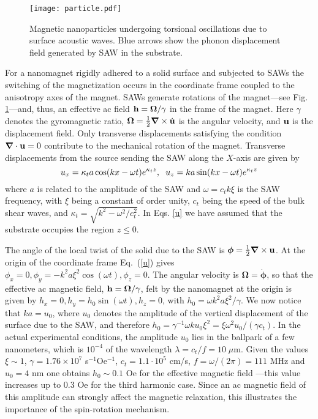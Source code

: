 \documentclass[aps,prb,floats,twocolumn]{revtex4}
\begin{document}
\begin{figure}[ht]
\begin{center}
\texttt{[image: particle.pdf]}
\caption{Magnetic nanoparticles undergoing torsional oscillations due to surface acoustic waves. Blue arrows show the phonon displacement field generated by SAW in the substrate.}
\label{particle}
\end{center}
\end{figure}
For a nanomagnet rigidly adhered to a solid surface and subjected to SAWs the switching of the magnetization occurs in the coordinate frame coupled to the anisotropy axes of the magnet. SAWs generate rotations of the magnet---see Fig. \ref{particle}---and, thus, an effective ac field ${\bf h} = {\bm \Omega}/\gamma$ in the frame of the magnet. Here $\gamma$ denotes the gyromagnetic ratio, ${\bm \Omega} = \frac{1}{2} {\bm \nabla} \times \dot{\bf u}$ is the angular velocity, and ${\bf u}$ is the displacement field.  Only transverse displacements satisfying the condition ${\bm \nabla} \cdot {\bf u} = 0$ contribute to the mechanical rotation of the magnet. Transverse displacements from the source sending the SAW along the $X$-axis are given by \cite{LL}
\begin{equation}\label{u}
u_x = \kappa_t a \cos(kx -\omega t) e^{\kappa_t z}, \hspace{0.2cm} u_z = ka\sin(kx -\omega t) e^{\kappa_t z}
\end{equation}
where $a$ is related to the amplitude of the SAW and $\omega = c_t k \xi$ is the SAW frequency, with $\xi$ being a constant of order unity, $c_t$ being the speed of the bulk shear waves, and $\kappa_t =\sqrt{k^2 - {\omega^2}/{c_t^2}}$. In Eqs. \eqref{u} we have assumed that the substrate occupies the region $z\leq0$.

The angle of the local twist of the solid due to the SAW is ${\bm \phi} = \frac{1}{2}{\bm \nabla} \times {\bf u}$.\cite{LL} At the origin of the coordinate frame Eq.\ (\ref{u}) gives $\phi_x  = 0, \phi_y  =  -k^2a\xi^2\cos(\omega t), \phi_z  = 0$. The angular velocity is ${\bm \Omega} = \dot{\bm \phi}$, so that the effective ac magnetic field, ${\bf h} = {\bm \Omega}/\gamma$, felt by the nanomagnet at the origin is given by $h_x  = 0, h_y = h_0\sin(\omega t), h_z = 0$, with $h _0 = \omega k^2a\xi^2/\gamma$. We now notice that $ka = u_0$, where $u_0$ denotes the amplitude of the vertical displacement of the surface due to the SAW, and therefore $h_0 = \gamma^{-1}\omega k u_0 \xi^2 = {\xi} \omega^2 u_0/(\gamma c_t)$. In the actual experimental conditions, the amplitude $u_0$ lies in the ballpark of a few nanometers,\cite{Comm2} which is $10^{-4}$ of the wavelength $\lambda = c_t/f = 10\;\mu$m. Given the values $\xi \sim 1$, $\gamma = 1.76\times 10^7$ s$^{-1}$Oe$^{-1}$, $c_t=1.1\cdot10^5$ cm/s, $f =\omega/(2\pi)=111$ MHz and $u_{0}=4$ nm one obtains $h_0 \sim 0.1$ Oe for the effective magnetic field ---this value increases up to $0.3$ Oe for the third harmonic case. Since an ac magnetic field of this amplitude can strongly affect the magnetic relaxation,\cite{Comm3} this illustrates the importance of the spin-rotation mechanism.
\end{document}

